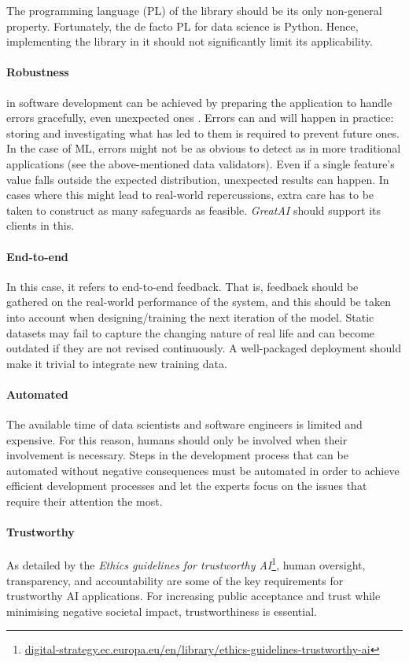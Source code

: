 The programming language (PL) of the library should be its only non-general property. Fortunately, the de facto PL for data science is Python. Hence, implementing the library in it should not significantly limit its applicability.

\paragraph{Robustness} in software development can be achieved by preparing the application to handle errors gracefully, even unexpected ones \cite{bishop1998robust}. Errors can and will happen in practice: storing and investigating what has led to them is required to prevent future ones. In the case of ML, errors might not be as obvious to detect as in more traditional applications (see the above-mentioned data validators). Even if a single feature's value falls outside the expected distribution, unexpected results can happen. In cases where this might lead to real-world repercussions, extra care has to be taken to construct as many safeguards as feasible. \textit{GreatAI} should support its clients in this.

\paragraph{End-to-end} In this case, it refers to end-to-end feedback. That is, feedback should be gathered on the real-world performance of the system, and this should be taken into account when designing/training the next iteration of the model. Static datasets may fail to capture the changing nature of real life and can become outdated if they are not revised continuously. A well-packaged deployment should make it trivial to integrate new training data.

\paragraph{Automated} The available time of data scientists and software engineers is limited and expensive. For this reason, humans should only be involved when their involvement is necessary. Steps in the development process that can be automated without negative consequences must be automated in order to achieve efficient development processes and let the experts focus on the issues that require their attention the most.

\paragraph{Trustworthy} As detailed by the \textit{Ethics guidelines for trustworthy AI}\footnote{\href{https://digital-strategy.ec.europa.eu/en/library/ethics-guidelines-trustworthy-ai}{digital-strategy.ec.europa.eu/en/library/ethics-guidelines-trustworthy-ai}}, human oversight, transparency, and accountability are some of the key requirements for trustworthy AI applications. For increasing public acceptance and trust while minimising negative societal impact, trustworthiness is essential.

